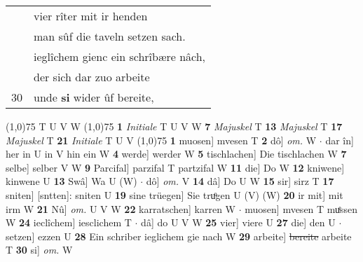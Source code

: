 \documentclass[8pt,a4paper,notitlepage]{article}
\begin{document}
\begin{table}[ht]
\begin{minipage}[t]{0.5\linewidth}
\begin{tabular}{rl}
 & vier rîter mit ir henden\\ 
 & man sûf die taveln setzen sach.\\ 
 & ieglîchem gienc ein schrîbære nâch,\\ 
 & der sich dar zuo arbeite\\ 
30 & unde \textbf{si} wider ûf bereite,\\ 
\end{tabular}
\scriptsize
\line(1,0){75} \newline
T U V W \newline
\line(1,0){75} \newline
\textbf{1} \textit{Initiale} T U V W  \textbf{7} \textit{Majuskel} T  \textbf{13} \textit{Majuskel} T  \textbf{17} \textit{Majuskel} T  \textbf{21} \textit{Initiale} T U V  \newline
\line(1,0){75} \newline
\textbf{1} muosen] mvesen T \textbf{2} dô] \textit{om.} W  $\cdot$ dar în] her in U in V hin ein W \textbf{4} werde] werder W \textbf{5} tischlachen] Die tischlachen W \textbf{7} selbe] selber V W \textbf{9} Parcifal] parzifal T partzifal W \textbf{11} die] Do W \textbf{12} kniwene] kinwene U \textbf{13} Swâ] Wa U (W)  $\cdot$ dô] \textit{om.} V \textbf{14} dâ] Do U W \textbf{15} sir] sirz T \textbf{17} sniten] [sntten]: sniten U \textbf{19} sine trüegen] Sie truͦgen U (V) (W) \textbf{20} ir mit] mit irm W \textbf{21} Nû] \textit{om.} U V W \textbf{22} karratschen] karren W  $\cdot$ muosen] mvesen T muͤssen W \textbf{24} ieclîchem] iesclichem T  $\cdot$ dâ] do U V W \textbf{25} vier] viere U \textbf{27} die] den U  $\cdot$ setzen] ezzen U \textbf{28} Ein schriber ieglichem gie nach W \textbf{29} arbeite] \sout{bereite} arbeite T \textbf{30} si] \textit{om.} W \newline
\end{minipage}
\end{table}
\end{document}
